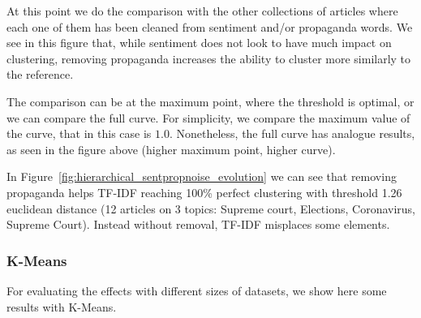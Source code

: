 At this point we do the comparison with the other collections of articles where each one of them has been cleaned from sentiment and/or propaganda words. We see in this figure that, while sentiment does not look to have much impact on clustering, removing propaganda increases the ability to cluster more similarly to the reference. 

The comparison can be at the maximum point, where the threshold is optimal, %
or we can compare the full curve. For simplicity, we compare the maximum value of the curve, that in this case is $1.0$.
Nonetheless, the full curve has analogue results, as seen in the figure above (higher maximum point, higher curve).

In Figure~\ref{fig:hierarchical_sentpropnoise_evolution} we can see that removing propaganda helps TF-IDF reaching 100\% perfect clustering with threshold 1.26 euclidean distance (12 articles on 3 topics: Supreme court, Elections, Coronavirus, Supreme Court). Instead without removal, TF-IDF misplaces some elements.


\subsubsection{K-Means}
For evaluating the effects with different sizes of datasets, we show here some results with K-Means.

